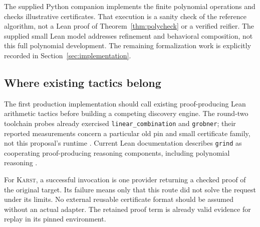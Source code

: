 \documentclass[11pt,letterpaper]{article}
\newcommand{\code}[1]{\nolinkurl{#1}}
\newcommand{\Karst}{\textsc{Karst}}
\theoremstyle{remark}
\begin{document}
\begin{center}
\end{center}

The supplied Python companion implements the finite polynomial operations and
checks illustrative certificates. That execution is a sanity check of the
reference algorithm, not a Lean proof of Theorem~\ref{thm:polycheck} or a
verified reifier. The supplied small Lean model addresses refinement and
behavioral composition, not this full polynomial development. The remaining
formalization work is explicitly recorded in Section~\ref{sec:implementation}.

\subsection{Where existing tactics belong}
The first production implementation should call existing proof-producing
Lean arithmetic tactics before building a competing discovery engine. The
round-two toolchain probes already exercised \code{linear_combination} and
\code{grobner}; their reported measurements concern a particular old pin and
small certificate family, not this proposal's runtime \cite{syn,workbenches}.
Current Lean documentation describes \code{grind} as cooperating proof-producing
reasoning components, including polynomial reasoning \cite{leangrind}.

For \Karst, a successful invocation is one provider returning a checked proof
of the original target. Its failure means only that this route did not solve
the request under its limits. No external reusable certificate format should
be assumed without an actual adapter. The retained proof term is already
valid evidence for replay in its pinned environment.
\end{document}
